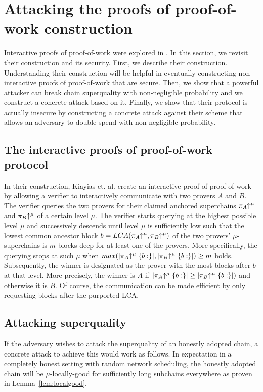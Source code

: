 \section{Attacking the proofs of proof-of-work construction}

Interactive proofs of proof-of-work were explored in \cite{KLS}. In this
section, we revisit their construction and its security. First, we describe
their construction. Understanding their construction will be helpful in
eventually constructing non-interactive proofs of proof-of-work that are secure.
Then, we show that a powerful attacker can break chain superquality with
non-negligible probability and we construct a concrete attack based on it.
Finally, we show that their protocol is actually insecure by
constructing a concrete attack against their scheme that allows an adversary
to double spend with non-negligible probability.

\subsection{The interactive proofs of proof-of-work protocol}

In their construction, Kiayias et. al. \cite{KLS} create an interactive proof of
proof-of-work by allowing a verifier to interactively communicate with two
provers $A$ and $B$. The verifier queries the two provers for their claimed
anchored superchains $\pi_A\negthickspace\uparrow^\mu$ and $\pi_B\negthickspace\uparrow^\mu$ of a
certain level $\mu$. The verifier starts querying at the highest possible level
$\mu$ and successively descends until level $\mu$ is sufficiently low such that
the lowest common ancestor block $b = LCA(\pi_A\negthickspace\uparrow^\mu,
\pi_B\negthickspace\uparrow^\mu)$ of the two provers' $\mu$-superchains is $m$ blocks deep
for at least one of the provers. More specifically, the querying stops at such
$\mu$ when $max(|\pi_A\negthickspace\uparrow^\mu\{b:\}|, |\pi_B\negthickspace\uparrow^\mu\{b:\}|) \geq
m$ holds. Subsequently, the winner is designated as the prover with the most
blocks after $b$ at that level. More precisely, the winner is $A$ if
$|\pi_A\negthickspace\uparrow^\mu\{b:\}| \geq |\pi_B\negthickspace\uparrow^\mu\{b:\}|)$ and otherwise it
is $B$. Of course, the communication can be made efficient by only requesting
blocks after the purported LCA.

\subsection{Attacking superquality}

If the adversary wishes to attack the superquality of an honestly adopted chain,
a concrete attack to achieve this would work as follows. In expectation in a
completely honest setting with random network scheduling, the honestly adopted
chain will be $\mu$-locally-good for sufficiently long subchains everywhere as
proven in Lemma~\ref{lem:localgood}.

